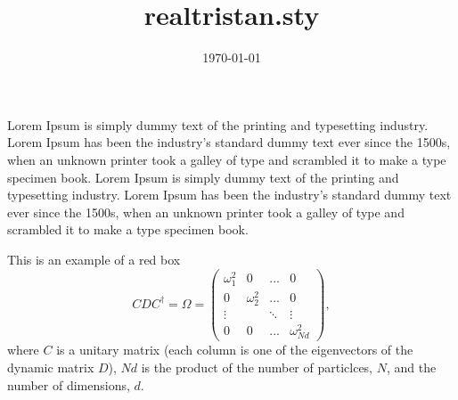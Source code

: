 \documentclass{article}
\title{realtristan.sty}
\author{\email{heytristaann@gmail.com}}
\date{\today}
\begin{document}
\maketitle
{} {
	\flex{}{
		\lalign*{
			& \kina{} \\\\
			& \kinb{} \\\\
			& \kinc{} \\\\
			& \kind{} \\\\
			& \kine{} \\
		}
	}
}
 {
	Lorem Ipsum is simply dummy text of the printing and typesetting industry. Lorem Ipsum has been the industry's standard dummy text ever since the 1500s, when an unknown printer took a galley of type and scrambled it to make a type specimen book.
	\malign*{
		\therefore \kina{}
	}
}
 {
	Lorem Ipsum is simply dummy text of the printing and typesetting industry. Lorem Ipsum has been the industry's standard dummy text ever since the 1500s, when an unknown printer took a galley of type and scrambled it to make a type specimen book.
	\lalign{
		\therefore \kinb{}
	}
}

\begin{redbox}{This is an example of a red box}
	\begin{equation*}
			C D C^{\dagger} = \Omega = \left(\begin{array}{cccc}
				\omega^2_1 & 0 & ... & 0\\
				0 & \omega^2_2 & ... & 0\\
				\vdots &  & \ddots & \vdots \\
				0 & 0 & ... & \omega^2_{Nd}
			\end{array}\right),
	\end{equation*}
	where $C$ is a unitary matrix (each column is one of the eigenvectors of the dynamic matrix $D$), $Nd$ is the product of the number of particlces, $N$, and the number of dimensions, $d$.
\end{redbox}
\end{document}
